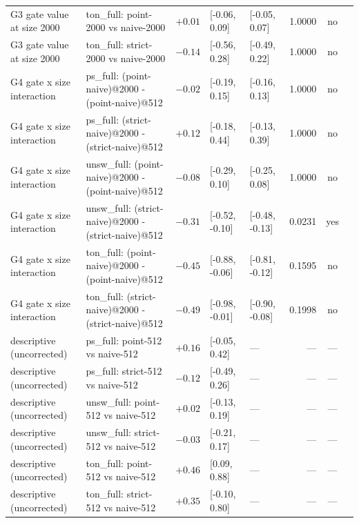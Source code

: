 \begin{table}[t]
\begin{tabular}{l l r l l r c l}
G3 gate value at size 2000 & ton\_full: point-2000 vs naive-2000 & $+0.01$ & [-0.06, 0.09] & [-0.05, 0.07] & 1.0000 & no &  \\
G3 gate value at size 2000 & ton\_full: strict-2000 vs naive-2000 & $-0.14$ & [-0.56, 0.28] & [-0.49, 0.22] & 1.0000 & no &  \\
G4 gate x size interaction & ps\_full: (point-naive)@2000 - (point-naive)@512 & $-0.02$ & [-0.19, 0.15] & [-0.16, 0.13] & 1.0000 & no &  \\
G4 gate x size interaction & ps\_full: (strict-naive)@2000 - (strict-naive)@512 & $+0.12$ & [-0.18, 0.44] & [-0.13, 0.39] & 1.0000 & no &  \\
G4 gate x size interaction & unsw\_full: (point-naive)@2000 - (point-naive)@512 & $-0.08$ & [-0.29, 0.10] & [-0.25, 0.08] & 1.0000 & no &  \\
G4 gate x size interaction & unsw\_full: (strict-naive)@2000 - (strict-naive)@512 & $-0.31$ & [-0.52, -0.10] & [-0.48, -0.13] & 0.0231 & yes &  \\
G4 gate x size interaction & ton\_full: (point-naive)@2000 - (point-naive)@512 & $-0.45$ & [-0.88, -0.06] & [-0.81, -0.12] & 0.1595 & no &  \\
G4 gate x size interaction & ton\_full: (strict-naive)@2000 - (strict-naive)@512 & $-0.49$ & [-0.98, -0.01] & [-0.90, -0.08] & 0.1998 & no &  \\
descriptive (uncorrected) & ps\_full: point-512 vs naive-512 & $+0.16$ & [-0.05, 0.42] & --- & --- & --- &  \\
descriptive (uncorrected) & ps\_full: strict-512 vs naive-512 & $-0.12$ & [-0.49, 0.26] & --- & --- & --- &  \\
descriptive (uncorrected) & unsw\_full: point-512 vs naive-512 & $+0.02$ & [-0.13, 0.19] & --- & --- & --- &  \\
descriptive (uncorrected) & unsw\_full: strict-512 vs naive-512 & $-0.03$ & [-0.21, 0.17] & --- & --- & --- &  \\
descriptive (uncorrected) & ton\_full: point-512 vs naive-512 & $+0.46$ & [0.09, 0.88] & --- & --- & --- &  \\
descriptive (uncorrected) & ton\_full: strict-512 vs naive-512 & $+0.35$ & [-0.10, 0.80] & --- & --- & --- &  \\
\bottomrule
\end{tabular}
\end{table}
